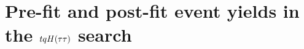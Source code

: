 \section{Pre-fit and post-fit event yields in the $tqH(\tau\tau)$ search}
\label{sec:prepostfit_yields_Htautau_appendix}


